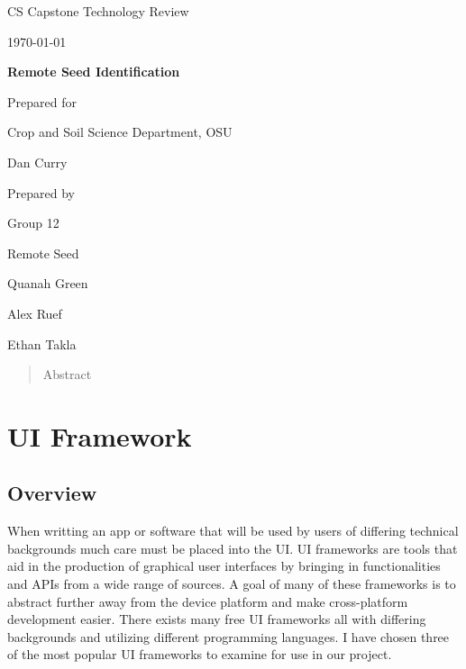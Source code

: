 \documentclass[onecolumn, draftclsnofoot,10pt, compsoc]{IEEEtran}
\def \CapstoneTeamName{		Remote Seed}
\def \CapstoneTeamNumber{		12}
\def \GroupMemberOne{			Quanah Green}
\def \GroupMemberTwo{			Alex Ruef}
\def \GroupMemberThree{			Ethan Takla}
\def \CapstoneProjectName{		Remote Seed Identification}
\def \CapstoneSponsorCompany{	Crop and Soil Science Department, OSU}
\def \CapstoneSponsorPerson{		Dan Curry}
\def \DocType{		%
				Technology Review
				}
\newcommand{\NameSigPair}[1]{\par
\makebox[2.75in][r]{#1} \hfil 	\makebox[3.25in]{\makebox[2.25in]{\hrulefill} \hfill		\makebox[.75in]{\hrulefill}}
\par\vspace{-12pt} \textit{\tiny\noindent
\makebox[2.75in]{} \hfil		\makebox[3.25in]{\makebox[2.25in][r]{Signature} \hfill	\makebox[.75in][r]{Date}}}}
\renewcommand{\NameSigPair}[1]{#1}
\begin{document}
\begin{titlepage}
    \begin{singlespace}
        \hfill 
        \par\vspace{.2in}
        \centering
        \scshape{
            \huge CS Capstone \DocType \par
            {\large\today}\par
            \vspace{.5in}
            \textbf{\Huge\CapstoneProjectName}\par
            \vfill
            {\large Prepared for}\par
            \Huge \CapstoneSponsorCompany\par
            \vspace{5pt}
            {\Large\NameSigPair{\CapstoneSponsorPerson}\par}
            {\large Prepared by }\par
            Group\CapstoneTeamNumber\par
            \CapstoneTeamName\par 
            \vspace{5pt}
            {\Large
                \NameSigPair{\GroupMemberOne}\par
                \NameSigPair{\GroupMemberTwo}\par
                \NameSigPair{\GroupMemberThree}\par
            }
            \vspace{20pt}
        }
        \begin{abstract}
        Abstract
        \end{abstract}     
    \end{singlespace}
\end{titlepage}
\newpage
{}
\tableofcontents
\clearpage
\section{UI Framework}
	\subsection{Overview}
		When writting an app or software that will be used by users of differing technical backgrounds much care must be placed into the UI.
		UI frameworks are tools that aid in the production of graphical user interfaces by bringing in functionalities and APIs from a wide range of sources.
		A goal of many of these frameworks is to abstract further away from the device platform and make cross-platform development easier.
		There exists many free UI frameworks all with differing backgrounds and utilizing different programming languages.
		I have chosen three of the most popular UI frameworks to examine for use in our project.
\end{document}
